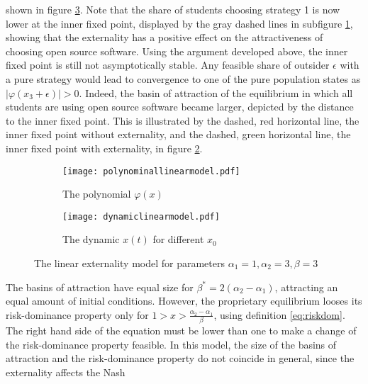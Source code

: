 shown in figure \ref{fig:plotmodellinear}.
Note that the share of students choosing strategy 1 is now lower at the 
inner fixed point, displayed by the gray dashed lines in subfigure 
\ref{fig:externalitypolynomial}, showing that the externality has a positive 
effect on the attractiveness of choosing open source software. 
Using the argument developed above, the inner fixed point is still not
asymptotically stable. Any feasible share of outsider $\epsilon$ 
with a pure strategy would lead to convergence to one of the 
pure population states as $|\varphi(x_3+\epsilon)|>0$.
Indeed, the basin of attraction of the equilibrium in which all 
students are using open source software became larger, 
depicted by the distance to the inner fixed point.
This is illustrated by the dashed, red horizontal line, 
the inner fixed point without externality, and the dashed, green horizontal 
line, the inner fixed point with externality, 
in figure \ref{fig:dynamiclinear}.
\begin{figure}[h]
        \centering
        \begin{subfigure}{.5\textwidth}
        \centering
        \texttt{[image: polynominallinearmodel.pdf]}
        \caption[Polynomial of the Externality Model]{The polynomial $\varphi(x)$} 
        \label{fig:externalitypolynomial}
        \end{subfigure}%
        \begin{subfigure}{.5\textwidth}
        \centering
        \texttt{[image: dynamiclinearmodel.pdf]}
        \caption[Replicator dynamic of the model with externality]{The dynamic $x(t)$ for different $x_0$} 
        \label{fig:dynamiclinear}
        \end{subfigure}%
        \caption[Polynomial and Dynamic of the Model with Externality]
        {The linear externality 
                model for parameters $\alpha_1=1,\alpha_2=3,\beta=3$}
        \label{fig:plotmodellinear}
\end{figure}
The basins of attraction have equal size for $\beta^* = 2 (\alpha_2 -\alpha_1)$,
attracting an equal amount of initial conditions. However,
the proprietary equilibrium looses its risk-dominance property 
only for $1 > x > \frac{\alpha_2-\alpha_1}{\beta}  $, using definition 
\ref{eq:riskdom}. The right hand side of the equation must be lower than one 
to make a change of the risk-dominance property feasible. In this model,
the size of the basins of attraction and the risk-dominance
property do not coincide in general, since the externality affects the Nash 
